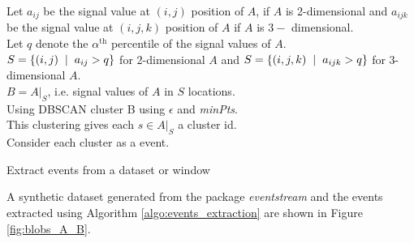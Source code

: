 \documentclass[a4paper,11pt]{article}
\begin{document}
\DontPrintSemicolon
\begin{algorithm}[!ht]
	\footnotesize
	Let $a_{ij}$ be the signal value at $(i, j)$ position of $A$, if $A$ is 2-dimensional and $a_{ijk}$ be the signal value at $(i, j, k)$ position of $A$ if $A$ is $3-$ dimensional. \\
	Let $q$ denote the $\alpha^{\text{th}}$ percentile of the signal values of $A$. \\
	$S = \{ (i,j) \hspace{2mm} | \hspace{2mm} a_{ij} > q \} $ for 2-dimensional $A$ and
	$S = \{ (i,j, k) \hspace{2mm} | \hspace{2mm} a_{ijk} > q \} $ for 3-dimensional $A$. \\
	$ B = A|_S$, i.e. signal values of $A$ in $S$ locations. \\
	Using DBSCAN cluster B using $\epsilon$ and \textit{minPts}. \\
	This clustering gives each $s \in A|_S$ a cluster id. \\

	Consider each cluster as a event. \,
	\caption{\footnotesize Extract events from a dataset or window}
	\label{algo:events_extraction}
\end{algorithm}

A synthetic dataset generated from the package \textit{eventstream} and the events extracted using Algorithm \ref{algo:events_extraction} are shown in Figure \ref{fig:blobs_A_B}.
\end{document}
